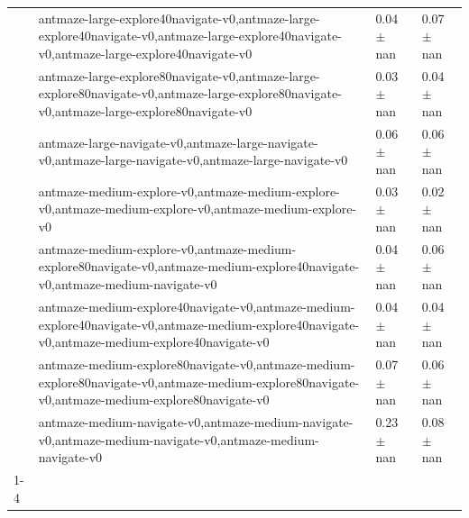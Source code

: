 \begin{tabular}{llll}
 & antmaze-large-explore40navigate-v0,antmaze-large-explore40navigate-v0,antmaze-large-explore40navigate-v0,antmaze-large-explore40navigate-v0 & 0.04 $\pm$ nan & 0.07 $\pm$ nan \\
 & antmaze-large-explore80navigate-v0,antmaze-large-explore80navigate-v0,antmaze-large-explore80navigate-v0,antmaze-large-explore80navigate-v0 & 0.03 $\pm$ nan & 0.04 $\pm$ nan \\
 & antmaze-large-navigate-v0,antmaze-large-navigate-v0,antmaze-large-navigate-v0,antmaze-large-navigate-v0 & 0.06 $\pm$ nan & 0.06 $\pm$ nan \\
 & antmaze-medium-explore-v0,antmaze-medium-explore-v0,antmaze-medium-explore-v0,antmaze-medium-explore-v0 & 0.03 $\pm$ nan & 0.02 $\pm$ nan \\
 & antmaze-medium-explore-v0,antmaze-medium-explore80navigate-v0,antmaze-medium-explore40navigate-v0,antmaze-medium-navigate-v0 & 0.04 $\pm$ nan & 0.06 $\pm$ nan \\
 & antmaze-medium-explore40navigate-v0,antmaze-medium-explore40navigate-v0,antmaze-medium-explore40navigate-v0,antmaze-medium-explore40navigate-v0 & 0.04 $\pm$ nan & 0.04 $\pm$ nan \\
 & antmaze-medium-explore80navigate-v0,antmaze-medium-explore80navigate-v0,antmaze-medium-explore80navigate-v0,antmaze-medium-explore80navigate-v0 & 0.07 $\pm$ nan & 0.06 $\pm$ nan \\
 & antmaze-medium-navigate-v0,antmaze-medium-navigate-v0,antmaze-medium-navigate-v0,antmaze-medium-navigate-v0 & 0.23 $\pm$ nan & 0.08 $\pm$ nan \\
\cline{1-4}
\bottomrule
\end{tabular}
